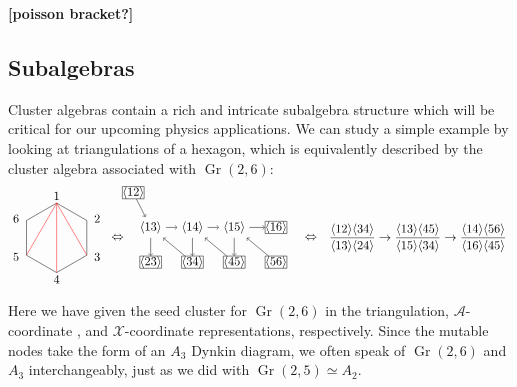 \documentclass[11pt]{article}
\DeclareMathOperator{\Gr}{Gr}
\def\ket#1{\langle #1 \rangle}
\def\xcoord{$\mathcal{X}$-coordinate }
\def\acoord{$\mathcal{A}$-coordinate }
\def\draftnote#1{{\bf [#1]}}
\def\drawLabeledHexagon{
\coordinate (P1) at (90:1);
\coordinate (P2) at (30:1);
\coordinate (P3) at (330:1);
\coordinate (P4) at (270:1);
\coordinate (P5) at (210:1);
\coordinate (P6) at (150:1);
\draw (P1) -- (P2) -- (P3) -- (P4) -- (P5) -- (P6) -- cycle;
\draw (0,1.2) node {1};
\draw (30:1.1) node[anchor=west] {2};
\draw (330:1.1) node[anchor=west] {3};
\draw (270:1.2) node {4};
\draw (210:1.1) node[anchor=east] {5};
\draw (150:1.1) node[anchor=east] {6};
}
\begin{document}
\draftnote{poisson bracket?}

\subsection{Subalgebras}\label{sec:subalgebras}

Cluster algebras contain a rich and intricate subalgebra structure which will be critical for our upcoming physics applications. We can study a simple example by looking at triangulations of a hexagon, which is equivalently described by the cluster algebra associated with $\Gr(2,6)$:
\begin{equation}\label{eq:gr26-seed}
\begin{gathered}
\begin{tikzpicture}
	\drawLabeledHexagon
  	\draw[color=red] (P1) -- (P3);
  	\draw[color=red] (P1) -- (P4);
  	\draw[color=red] (P1) -- (P5);
	\draw (1.75,0) node {$\Leftrightarrow$};
	\begin{scope}[xshift = .2cm, yshift = .3cm]
	\def \xSep {1.2}
	\def \xInit {2.5}
    \node (13) at (\xInit,0) {$\ket{13}$};
    \node (14) at (\xInit+\xSep,0) {$\ket{14}$};
    \node (15) at (\xInit+2*\xSep,0) {$\ket{15}$};
	\node[draw, inner sep=0mm] (12) at (2,1) {$\ket{12}$};
    \node[draw, inner sep=0mm] (16) at (\xInit+3*\xSep,0) {$\ket{16}$};
    \node[draw, inner sep=0mm] (56) at (\xInit+3*\xSep,-1) {$\ket{56}$};
    \node[draw, inner sep=0mm] (45) at (\xInit+2*\xSep,-1) {$\ket{45}$};
    \node[draw, inner sep=0mm] (34) at (\xInit+\xSep,-1) {$\ket{34}$};
    \node[draw, inner sep=0mm] (23) at (\xInit,-1) {$\ket{23}$};
    \draw[->] (12) -- (13);
    \draw[->] (13) -- (14);
    \draw[->] (14) -- (15);
    \draw[->] (15) -- (16);
    \draw[->] (13) -- (23);
    \draw[->] (34) -- (13);
    \draw[->] (14) -- (34);
    \draw[->] (45) -- (14);
    \draw[->] (15) -- (45);
    \draw[->] (56) -- (15);
    \end{scope}
    \draw (7.3,0) node {$\Leftrightarrow$};
    \node[anchor=west] at (7.7,0) {$\displaystyle \frac{\ket{12}\ket{34}}{\ket{13}\ket{24}}\to\frac{\ket{13}\ket{45}}{\ket{15}\ket{34}}\to\frac{\ket{14}\ket{56}}{\ket{16}\ket{45}} $};
\end{tikzpicture} 
\end{gathered}
\end{equation}
Here we have given the seed cluster for $\Gr(2,6)$ in the triangulation, \acoord, and \xcoord representations, respectively. Since the mutable nodes take the form of an $A_3$ Dynkin diagram, we often speak of $\Gr(2,6)$ and $A_3$ interchangeably, just as we did with $\Gr(2,5) \simeq A_2$. 
\end{document}

